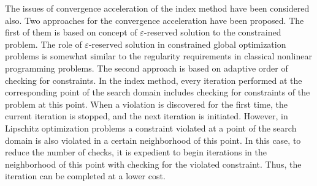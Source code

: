 The issues of convergence acceleration of the index method have been considered also. Two approaches for the convergence acceleration have been proposed. The first of them is based on concept of $\varepsilon$-reserved solution to the constrained problem. The role of $\varepsilon$-reserved solution in constrained global optimization problems is somewhat similar to the regularity requirements in classical nonlinear programming problems. The second approach is based on adaptive order of checking for constraints. In the index method, every iteration performed at the corresponding point of the search domain includes checking for constraints of the problem at this point. When a violation is discovered for the first time, the current iteration is stopped, and the next iteration is initiated. However, in Lipschitz optimization problems a constraint violated at a point of the search domain is also violated in a certain neighborhood of this point. In this case, to reduce the number of checks, it is expedient to begin iterations in the neighborhood of this point with checking for the violated constraint. Thus, the iteration can be completed at a lower cost.

